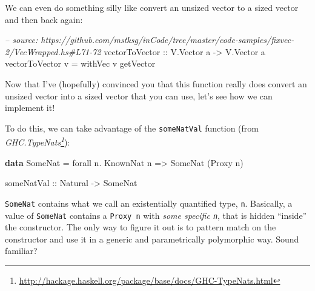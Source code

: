 \documentclass[]{article}
\newenvironment{Shaded}{}{}
\newcommand{\KeywordTok}[1]{\textcolor[rgb]{0.00,0.44,0.13}{\textbf{#1}}}
\newcommand{\DataTypeTok}[1]{\textcolor[rgb]{0.56,0.13,0.00}{#1}}
\newcommand{\DecValTok}[1]{\textcolor[rgb]{0.25,0.63,0.44}{#1}}
\newcommand{\CommentTok}[1]{\textcolor[rgb]{0.38,0.63,0.69}{\textit{#1}}}
\newcommand{\OtherTok}[1]{\textcolor[rgb]{0.00,0.44,0.13}{#1}}
\newcommand{\FunctionTok}[1]{\textcolor[rgb]{0.02,0.16,0.49}{#1}}
\newcommand{\NormalTok}[1]{#1}
\renewcommand{\href}[2]{#2\footnote{\url{#1}}}
\begin{document}
\begin{Shaded}
\end{Shaded}

We can even do something silly like convert an unsized vector to a sized vector
and then back again:

\begin{Shaded}
\begin{Highlighting}[]
\CommentTok{-- source: https://github.com/mstksg/inCode/tree/master/code-samples/fixvec-2/VecWrapped.hs#L71-72}
\OtherTok{vectorToVector ::} \DataTypeTok{V.Vector}\NormalTok{ a }\OtherTok{->} \DataTypeTok{V.Vector}\NormalTok{ a}
\NormalTok{vectorToVector v }\FunctionTok{=}\NormalTok{ withVec v getVector}
\end{Highlighting}
\end{Shaded}

Now that I've (hopefully) convinced you that this function really does convert
an unsized vector into a sized vector that you can use, let's see how we can
implement it!

To do this, we can take advantage of the \texttt{someNatVal} function (from
\emph{\href{http://hackage.haskell.org/package/base/docs/GHC-TypeNats.html}{GHC.TypeNats}}):

\begin{Shaded}
\begin{Highlighting}[]
\KeywordTok{data} \DataTypeTok{SomeNat} \FunctionTok{=}\NormalTok{ forall n}\FunctionTok{.} \DataTypeTok{KnownNat}\NormalTok{ n }\OtherTok{=>} \DataTypeTok{SomeNat}\NormalTok{ (}\DataTypeTok{Proxy}\NormalTok{ n)}

\OtherTok{someNatVal ::} \DataTypeTok{Natural} \OtherTok{->} \DataTypeTok{SomeNat}
\end{Highlighting}
\end{Shaded}

\texttt{SomeNat} contains what we call an existentially quantified type,
\texttt{n}. Basically, a value of \texttt{SomeNat} contains a \texttt{Proxy\ n}
with \emph{some specific \texttt{n}}, that is hidden ``inside'' the constructor.
The only way to figure it out is to pattern match on the constructor and use it
in a generic and parametrically polymorphic way. Sound familiar?
\end{document}
